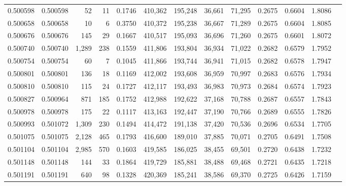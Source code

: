 \begin{tabular}{rrrrrrrrrrrrr}
0.500598 & 0.500598 &    52 &    11 &                                     0.1746 & 410,362 & 195,248 &  36,661 &  71,295 & 0.2675 & 0.6604 & 1.8086 \\
0.500658 & 0.500658 &    10 &     6 &                                     0.3750 & 410,372 & 195,238 &  36,667 &  71,289 & 0.2675 & 0.6604 & 1.8085 \\
0.500676 & 0.500676 &   145 &    29 &                                     0.1667 & 410,517 & 195,093 &  36,696 &  71,260 & 0.2675 & 0.6601 & 1.8072 \\
0.500740 & 0.500740 & 1,289 &   238 &                                     0.1559 & 411,806 & 193,804 &  36,934 &  71,022 & 0.2682 & 0.6579 & 1.7952 \\
0.500754 & 0.500754 &    60 &     7 &                                     0.1045 & 411,866 & 193,744 &  36,941 &  71,015 & 0.2682 & 0.6578 & 1.7947 \\
0.500801 & 0.500801 &   136 &    18 &                                     0.1169 & 412,002 & 193,608 &  36,959 &  70,997 & 0.2683 & 0.6576 & 1.7934 \\
0.500810 & 0.500810 &   115 &    24 &                                     0.1727 & 412,117 & 193,493 &  36,983 &  70,973 & 0.2684 & 0.6574 & 1.7923 \\
0.500827 & 0.500964 &   871 &   185 &                                     0.1752 & 412,988 & 192,622 &  37,168 &  70,788 & 0.2687 & 0.6557 & 1.7843 \\
0.500978 & 0.500978 &   175 &    22 &                                     0.1117 & 413,163 & 192,447 &  37,190 &  70,766 & 0.2689 & 0.6555 & 1.7826 \\
0.500993 & 0.501072 & 1,309 &   230 &                                     0.1494 & 414,472 & 191,138 &  37,420 &  70,536 & 0.2696 & 0.6534 & 1.7705 \\
0.501075 & 0.501075 & 2,128 &   465 &                                     0.1793 & 416,600 & 189,010 &  37,885 &  70,071 & 0.2705 & 0.6491 & 1.7508 \\
0.501104 & 0.501104 & 2,985 &   570 &                                     0.1603 & 419,585 & 186,025 &  38,455 &  69,501 & 0.2720 & 0.6438 & 1.7232 \\
0.501148 & 0.501148 &   144 &    33 &                                     0.1864 & 419,729 & 185,881 &  38,488 &  69,468 & 0.2721 & 0.6435 & 1.7218 \\
0.501191 & 0.501191 &   640 &    98 &                                     0.1328 & 420,369 & 185,241 &  38,586 &  69,370 & 0.2725 & 0.6426 & 1.7159 \\

\end{tabular}
